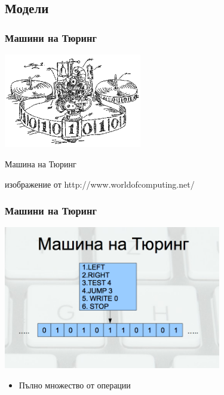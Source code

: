 \documentclass{beamer}
\begin{document}
\subsection{Модели}


\begin{frame}[fragile]
\frametitle{Машини на Тюринг}


\begin{center}
\includegraphics[width=6cm]{images/turingmachine}
\end{center}
\begin{center}
   Машина на Тюринг

   изображение от http://www.worldofcomputing.net/
\end{center}

\end{frame}


\begin{frame}[fragile]
\frametitle{Машини на Тюринг}


\begin{center}
  
\includegraphics[width=9.5cm]{images/turing}

\begin{itemize}
  \item Пълно множество от операции
\end{itemize}

\end{center}

\end{frame}
\end{document}

